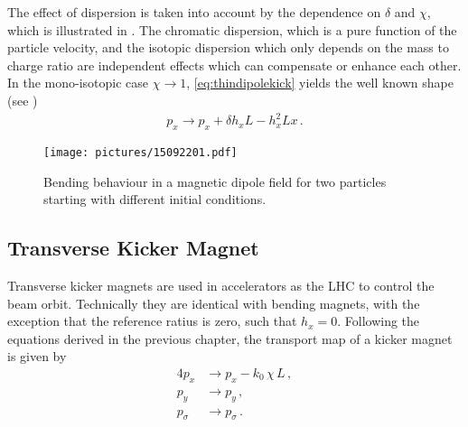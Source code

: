 %
The effect of dispersion is taken into account by the dependence on $\delta$ and $\chi$, which is illustrated in . The chromatic dispersion, which is a pure function of the particle velocity, and the isotopic dispersion which only depends on the mass to charge ratio are independent effects which can compensate or enhance each other. In the mono-isotopic case $\chi \rightarrow 1$, \eqref{eq:thindipolekick} yields the well known shape (see \cite{})
\begin{align}
p_x \rightarrow p_x + \delta h_x L - h_x^2 L x \, .
\end{align} 

  \begin{figure}[t]
  \centering
  \texttt{[image: pictures/15092201.pdf]}
  \caption{Bending behaviour in a magnetic dipole field for two particles starting with different initial conditions.}  
  \label{pic:15092201}
  \end{figure}

\subsection{Transverse Kicker Magnet}

Transverse kicker magnets are used in accelerators as the LHC to control the beam orbit. Technically they are identical with bending magnets, with the exception that the reference ratius is zero, such that $h_x=0$. Following the equations derived in the previous chapter, the transport map of a kicker magnet is given by
\begin{alignat}{4}
p_x & \rightarrow p_x - k_0 \, \chi \, L\, \label{eq:thindipolekick} ,\\ 
p_y & \rightarrow p_y\, ,\\ 
p_\sigma & \rightarrow p_\sigma \, .
\end{alignat}


